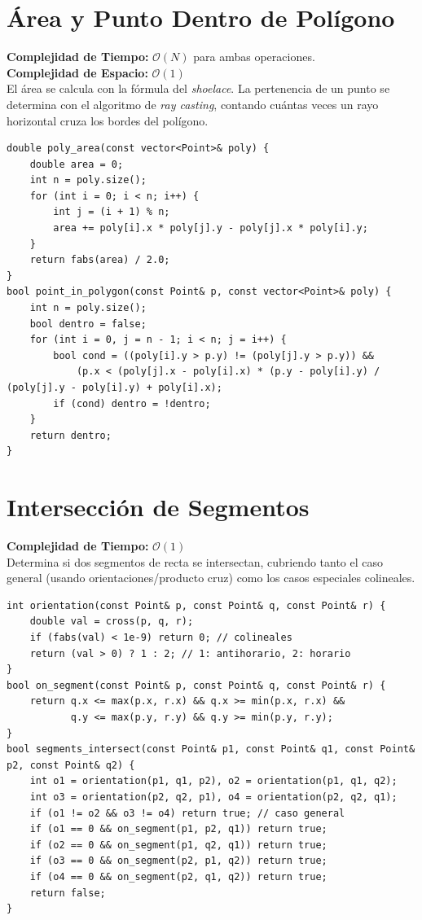 \documentclass[10pt,twocolumn,letterpaper]{report}
\begin{document}
\section{Área y Punto Dentro de Polígono}
\textbf{Complejidad de Tiempo:} $\mathcal{O}(N)$ para ambas operaciones. \\
\textbf{Complejidad de Espacio:} $\mathcal{O}(1)$ \\
El área se calcula con la fórmula del \textit{shoelace}. La pertenencia de un punto se determina con el algoritmo de \textit{ray casting}, contando cuántas veces un rayo horizontal cruza los bordes del polígono.
\begin{lstlisting}
double poly_area(const vector<Point>& poly) {
    double area = 0;
    int n = poly.size();
    for (int i = 0; i < n; i++) {
        int j = (i + 1) % n;
        area += poly[i].x * poly[j].y - poly[j].x * poly[i].y;
    }
    return fabs(area) / 2.0;
}
bool point_in_polygon(const Point& p, const vector<Point>& poly) {
    int n = poly.size();
    bool dentro = false;
    for (int i = 0, j = n - 1; i < n; j = i++) {
        bool cond = ((poly[i].y > p.y) != (poly[j].y > p.y)) &&
            (p.x < (poly[j].x - poly[i].x) * (p.y - poly[i].y) / (poly[j].y - poly[i].y) + poly[i].x);
        if (cond) dentro = !dentro;
    }
    return dentro;
}
\end{lstlisting}
\section{Intersección de Segmentos}
\textbf{Complejidad de Tiempo:} $\mathcal{O}(1)$ \\
Determina si dos segmentos de recta se intersectan, cubriendo tanto el caso general (usando orientaciones/producto cruz) como los casos especiales colineales.
\begin{lstlisting}
int orientation(const Point& p, const Point& q, const Point& r) {
    double val = cross(p, q, r);
    if (fabs(val) < 1e-9) return 0; // colineales
    return (val > 0) ? 1 : 2; // 1: antihorario, 2: horario
}
bool on_segment(const Point& p, const Point& q, const Point& r) {
    return q.x <= max(p.x, r.x) && q.x >= min(p.x, r.x) &&
           q.y <= max(p.y, r.y) && q.y >= min(p.y, r.y);
}
bool segments_intersect(const Point& p1, const Point& q1, const Point& p2, const Point& q2) {
    int o1 = orientation(p1, q1, p2), o2 = orientation(p1, q1, q2);
    int o3 = orientation(p2, q2, p1), o4 = orientation(p2, q2, q1);
    if (o1 != o2 && o3 != o4) return true; // caso general
    if (o1 == 0 && on_segment(p1, p2, q1)) return true;
    if (o2 == 0 && on_segment(p1, q2, q1)) return true;
    if (o3 == 0 && on_segment(p2, p1, q2)) return true;
    if (o4 == 0 && on_segment(p2, q1, q2)) return true;
    return false;
}
\end{lstlisting}
\end{document}
